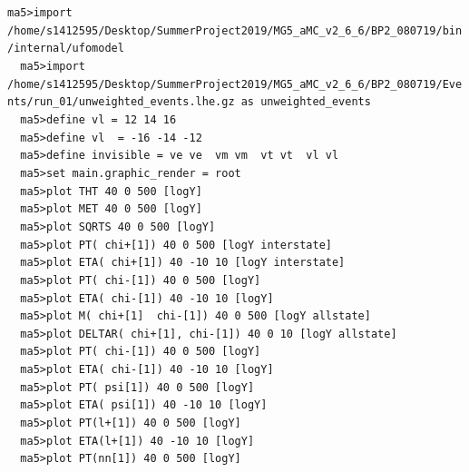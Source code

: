 \documentclass[a4paper, 10pt]{article}
\begin{document}
\texttt{ma5>import /\-home/\-s1412595/\-Desktop/\-SummerProject2019/\-MG5\_aMC\_v2\_6\_6/\-BP2\_080719/\-bin/\-internal/\-ufomodel\\
}
\texttt{ }\texttt{ }\texttt{ma5>import /\-home/\-s1412595/\-Desktop/\-SummerProject2019/\-MG5\_aMC\_v2\_6\_6/\-BP2\_080719/\-Events/\-run\_01/\-unweighted\_events.lhe.gz as unweighted\_events\\
}
\texttt{ }\texttt{ }\texttt{ma5>define vl = 12 14 16\\
}
\texttt{ }\texttt{ }\texttt{ma5>define vl~ = -16 -14 -12\\
}
\texttt{ }\texttt{ }\texttt{ma5>define invisible = ve ve~ vm vm~ vt vt~ vl vl~\\
}
\texttt{ }\texttt{ }\texttt{ma5>set main.graphic\_render = root\\
}
\texttt{ }\texttt{ }\texttt{ma5>plot THT   40 0 500 [logY]\\
}
\texttt{ }\texttt{ }\texttt{ma5>plot MET   40 0 500 [logY]\\
}
\texttt{ }\texttt{ }\texttt{ma5>plot SQRTS 40 0 500 [logY]\\
}
\texttt{ }\texttt{ }\texttt{ma5>plot  PT(~chi+[1]) 40 0  500 [logY interstate]\\
}
\texttt{ }\texttt{ }\texttt{ma5>plot ETA(~chi+[1]) 40 -10 10 [logY interstate]\\
}
\texttt{ }\texttt{ }\texttt{ma5>plot  PT(~chi-[1]) 40 0  500 [logY]\\
}
\texttt{ }\texttt{ }\texttt{ma5>plot ETA(~chi-[1]) 40 -10 10 [logY]\\
}
\texttt{ }\texttt{ }\texttt{ma5>plot M(~chi+[1] ~chi-[1]) 40 0  500 [logY allstate]\\
}
\texttt{ }\texttt{ }\texttt{ma5>plot DELTAR(~chi+[1],~chi-[1]) 40 0 10 [logY allstate]\\
}
\texttt{ }\texttt{ }\texttt{ma5>plot  PT(~chi-[1]) 40 0  500 [logY]\\
}
\texttt{ }\texttt{ }\texttt{ma5>plot ETA(~chi-[1]) 40 -10 10 [logY]\\
}
\texttt{ }\texttt{ }\texttt{ma5>plot  PT(~psi[1]) 40 0  500 [logY]\\
}
\texttt{ }\texttt{ }\texttt{ma5>plot ETA(~psi[1]) 40 -10 10 [logY]\\
}
\texttt{ }\texttt{ }\texttt{ma5>plot  PT(l+[1]) 40 0  500 [logY]\\
}
\texttt{ }\texttt{ }\texttt{ma5>plot ETA(l+[1]) 40 -10 10 [logY]\\
}
\texttt{ }\texttt{ }\texttt{ma5>plot  PT(nn[1]) 40 0  500 [logY]\\
}
\end{document}
